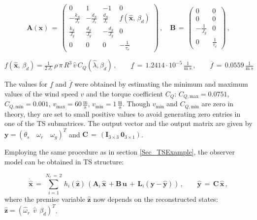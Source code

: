 \documentclass[a4paper]{article}
\newcommand{\xhat}{\widehat{x}}
\newcommand{\yhat}{\widehat{y}}
\newcommand{\zhat}{\widehat{z}}
\newcommand{\zhatB}{\widehat{\B{z}}}
\newcommand{\xhatP}{\dot{\widehat{x}}}
\newcommand{\x}{\times}
\newcommand{\B}[1]{\mathbf{#1}}
\newcommand{\fmax}{\overline{f}}
\newcommand{\fmin}{\underline{f}}
\begin{document}
\begin{equation}
\B{A}\left(\B{x}\right) \, = \, \begin{pmatrix}
			0       			&	1       			&	-1   				&	0									\\
            -\frac{k_S}{J_r}  	&	-\frac{d_S}{J_r}  	&   \frac{d_S}{J_r}		&	f\left(\B{\xhat},\,\beta_d\right)	\\
            \frac{k_S}{J_g}   	&   \frac{d_S}{J_g}   	&   -\frac{d_S}{J_g} 	&	0									\\
            0					&	0					&	0					&	-\frac{1}{\tau_v}
           \end{pmatrix} \, , \quad
\B{B} \, = \, \begin{pmatrix}
				0				&	0				\\
				0   			&	0				\\
				-\frac{1}{J_g}	&	0				\\
				0				&	\frac{1}{\tau_v}
			\end{pmatrix}	\, ,
\label{Eqn_NLMatrix_Obs1}
\end{equation}

$f\left(\B{\xhat},\,\beta_d\right) = \frac{1}{2\, J_r} \, \rho \, \pi \, R^3 \, \hat{v} \, C_Q\left(\hat{\lambda}, \beta_d\right) \, ,
	\qquad \fmin 	\, = \, 1.2414 \cdot 10^{-5} \, \frac{1}{\text{m s}} \, , \qquad \fmax 	\, = \, 0.0559 \, \frac{1}{\text{m s}}$

The values for $\fmin$ and $\fmax$ were obtained by estimating the minimum and maximum values of the wind speed $v$ and the torque coefficient $C_Q$: $C_{Q,\text{max}} = 0.0751$,  $C_{Q,\text{min}} = 0.001$, $v_\text{max} = 60 \,\frac{\text{m}}{\text{s}}$, $v_\text{min} = 1 \,\frac{\text{m}}{\text{s}}$. Though $v_\text{min}$ and $C_{Q,\text{min}}$ are zero in theory, they are set to small positive values to avoid generating zero entries in one of the TS submatrices.
The output vector and the output matrix are given by $\B{y} = \left(\theta_s \quad \omega_r \quad \omega_g\right)^T$ and $\B{C} \, = \, \left(\B{I}_{3 \x 3} \: \B{0}_{3 \x 1}\right)$.

Employing the same procedure as in section \ref{Sec_TSExample}, the observer model can be obtained in TS structure:

\begin{equation}
 \B{\xhatP} \, = \, \sum\limits_{i=1}^{N_r\,=\,2} \, h_i(\B{\zhat})\, \left(\B{A}_i \, \B{\xhat} \, + \B{B \, u} \, + \, \B{L}_i \left(\B{y} - \B{\yhat}\right) \right) \, , \qquad
 \B{\yhat}	 \, = \, \B{C \, \xhat} \, ,
\label{Eqn_TS_Obs}
\end{equation}
\newline where the premise variable $\zhatB$ now depends on the reconstructed states: $\zhatB = \left(\hat{\omega}_r \:\: \hat{v} \:\: \beta_d\right)^T$.
\end{document}
